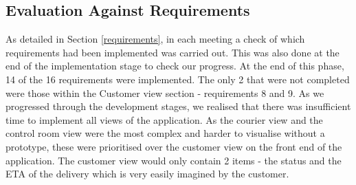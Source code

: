 \subsection{Evaluation Against Requirements}

As detailed in Section \ref{requirements}, in each meeting a check of which requirements had been implemented was carried out. This was also done at the end of the implementation stage to check our progress. At the end of this phase, 14 of the 16 requirements were implemented. The only 2 that were not completed were those within the Customer view section - requirements 8 and 9. As we progressed through the development stages, we realised that there was insufficient time to implement all views of the application. As the courier view and the control room view were the most complex and harder to visualise without a prototype, these were prioritised over the customer view on the front end of the application. The customer view would only contain 2 items - the status and the ETA of the delivery which is very easily imagined by the customer. 